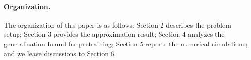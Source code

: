 






\paragraph{Organization.}
The organization of this paper is as follows:
Section 2 describes the problem setup; Section 3 provides the approximation result; Section 4 analyzes the generalization bound for pretraining; Section 5 reports the numerical simulations; and we leave discussions to Section 6.